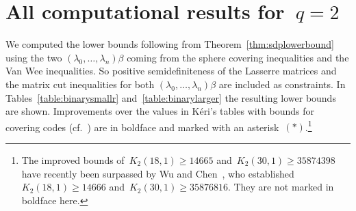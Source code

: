 \documentclass[10pt,a4paper]{article}
\theoremstyle{definition}
\begin{document}
\appendix 
\section{All computational results for~\texorpdfstring{$q=2$}{q=2}\label{appendix:tablesbinary}}
We computed the lower bounds following from Theorem~\ref{thm:sdplowerbound} using the two $(\lambda_0,\ldots,\lambda_n)\beta$ coming from the sphere covering inequalities and the Van Wee inequalities. So positive semidefiniteness of the Lasserre matrices and the matrix cut inequalities for both $(\lambda_0,\ldots,\lambda_n)\beta$ are included as constraints. In Tables~\ref{table:binarysmallr} and~\ref{table:binarylarger} the resulting lower bounds are shown. Improvements over the values in K\'eri's tables with bounds for covering codes (cf.~\cite{KeriTables}) are in boldface and marked with an asterisk~$(*)$.\footnote{The improved bounds of~$K_2(18,1) \geq 14665$ and~$K_2(30,1) \geq 35874398$ have recently been surpassed by Wu and Chen~\cite{WuChen24}, who established~$K_2(18,1) \geq 14666$ and~$K_2(30,1) \geq 35876816$. They are not marked in boldface here.}
\end{document}
